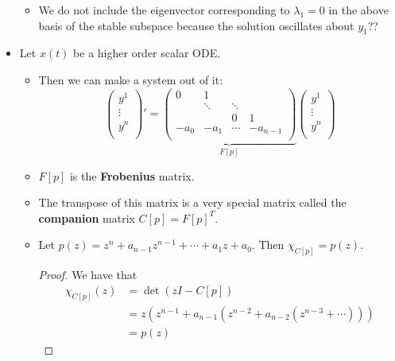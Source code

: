 \documentclass[../notes.tex]{subfiles}
\begin{document}
\begin{itemize}
    \begin{itemize}
        \item We do not include the eigenvector corresponding to $\lambda_1=0$ in the above basis of the stable subspace because the solution oscillates about $y_1$??
    \end{itemize}
    \item Let $x(t)$ be a higher order scalar ODE.
    \begin{itemize}
        \item Then we can make a system out of it:
        \begin{equation*}
            \begin{pmatrix}
                y^1\\
                \vdots\\
                y^n\\
            \end{pmatrix}'
            = \underbrace{
                \begin{pmatrix}
                    0 & 1 &  & \\
                     & \ddots & \ddots & \\
                     &  & 0 & 1\\
                    -a_0 & -a_1 & \cdots & -a_{n-1}\\
                \end{pmatrix}
            }_{F[p]}
            \begin{pmatrix}
                y^1\\
                \vdots\\
                y^n\\
            \end{pmatrix}
        \end{equation*}
        \item $F[p]$ is the \textbf{Frobenius} matrix.
        \item The transpose of this matrix is a very special matrix called the \textbf{companion} matrix $C[p]=F[p]^T$.
        \item Let $p(z)=z^n+a_{n-1}z^{n-1}+\cdots+a_1z+a_0$. Then $\chi_{C[p]}=p(z)$.
        \begin{proof}
            We have that
            \begin{align*}
                \chi_{C[p]}(z) &= \det(zI-C[p])\\
                &= z(z^{n-1}+a_{n-1}(z^{n-2}+a_{n-2}(z^{n-3}+\cdots)))\\
                &= p(z)

\end{align*}
\end{proof}
\end{itemize}
\end{itemize}
\end{document}
